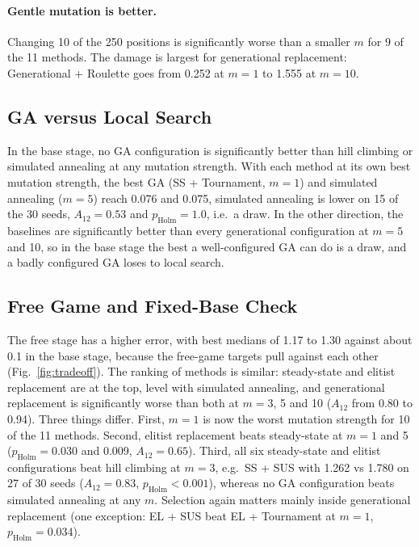 \paragraph{Gentle mutation is better.} Changing 10 of the 250 positions is significantly worse than a smaller $m$ for 9 of the 11 methods. The damage is largest for generational replacement: Generational + Roulette goes from 0.252 at $m = 1$ to 1.555 at $m = 10$.
\subsection{GA versus Local Search}
\label{sec:res-baselines}

In the base stage, no GA configuration is significantly better than hill climbing or simulated annealing at any mutation strength. With each method at its own best mutation strength, the best GA (SS + Tournament, $m = 1$) and simulated annealing ($m = 5$) reach 0.076 and 0.075, simulated annealing is lower on 15 of the 30 seeds, $A_{12} = 0.53$ and $p_{\mathrm{Holm}} = 1.0$, i.e.\ a draw.
In the other direction, the baselines are significantly better than every generational configuration at $m = 5$ and 10, so in the base stage the best a well-configured GA can do is a draw, and a badly configured GA loses to local search.

\subsection{Free Game and Fixed-Base Check}
\label{sec:res-free}

The free stage has a higher error, with best medians of 1.17 to 1.30 against about 0.1 in the base stage, because the free-game targets pull against each other (Fig.~\ref{fig:tradeoff}). The ranking of methods is similar: steady-state and elitist replacement are at the top, level with simulated annealing, and generational replacement is significantly worse than both at $m = 3$, 5 and 10 ($A_{12}$ from 0.80 to 0.94). Three things differ. First, $m = 1$ is now the worst mutation strength for 10 of the 11 methods. Second, elitist replacement beats steady-state at $m = 1$ and 5 ($p_{\mathrm{Holm}} = 0.030$ and 0.009, $A_{12} = 0.65$). Third, all six steady-state and elitist configurations beat hill climbing at $m = 3$, e.g.\ SS + SUS with 1.262 vs 1.780 on 27 of 30 seeds ($A_{12} = 0.83$, $p_{\mathrm{Holm}} < 0.001$), whereas no GA configuration beats simulated annealing at any $m$. Selection again matters mainly inside generational replacement (one exception: EL + SUS beat EL + Tournament at $m = 1$, $p_{\mathrm{Holm}} = 0.034$).

